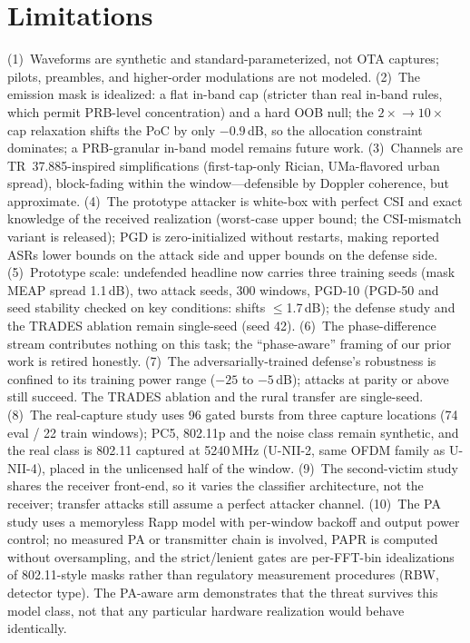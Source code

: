\documentclass[review]{elsarticle}
\begin{document}
\section{Limitations}
\label{sec:limitations}

(1)~Waveforms are synthetic and standard-parameterized, not OTA captures;
pilots, preambles, and higher-order modulations are not modeled.
(2)~The emission mask is idealized: a flat in-band cap (stricter than real
in-band rules, which permit PRB-level concentration) and a hard OOB null;
the $2\times\!\to\!10\times$ cap relaxation shifts the PoC by only
$-0.9$\,dB, so the allocation constraint dominates; a PRB-granular in-band
model remains future work.
(3)~Channels are TR~37.885-inspired simplifications (first-tap-only Rician,
UMa-flavored urban spread), block-fading within the window---defensible by
Doppler coherence, but approximate.
(4)~The prototype attacker is white-box with perfect CSI and exact knowledge
of the received realization (worst-case upper bound; the CSI-mismatch
variant is released); PGD is zero-initialized without restarts, making
reported ASRs lower bounds on the attack side and upper bounds on the
defense side.
(5)~Prototype scale: undefended headline now carries three training seeds
(mask MEAP spread 1.1\,dB), two attack seeds, 300 windows, PGD-10 (PGD-50
and seed stability checked on key conditions: shifts $\le$1.7\,dB); the
defense study and the TRADES ablation remain single-seed (seed 42).
(6)~The phase-difference stream contributes nothing on this task; the
``phase-aware'' framing of our prior work is retired honestly.
(7)~The adversarially-trained defense's robustness is confined to its
training power range ($-25$ to $-5$\,dB); attacks at parity or above still
succeed. The TRADES ablation and the rural transfer are single-seed.
(8)~The real-capture study uses 96 gated bursts from three capture
locations (74 eval / 22 train windows); PC5, 802.11p and the noise class
remain synthetic, and the real class is 802.11 captured at 5240\,MHz
(U-NII-2, same OFDM family as U-NII-4), placed in the unlicensed half of
the window. (9)~The second-victim study shares the receiver front-end, so
it varies the classifier architecture, not the receiver; transfer attacks
still assume a perfect attacker channel. (10)~The PA study uses a
memoryless Rapp model with per-window backoff and output power control;
no measured PA or transmitter chain is involved, PAPR is computed
without oversampling, and the strict/lenient gates are per-FFT-bin
idealizations of 802.11-style masks rather than regulatory measurement
procedures (RBW, detector type). The PA-aware arm demonstrates that the
threat survives this model class, not that any particular hardware
realization would behave identically.
\end{document}
